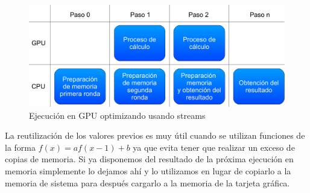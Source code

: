 \begin{figure}
	\centering
	\includegraphics[width=1\textwidth]{images/ejec_gpu_complex.pdf}
	\caption{Ejecución en GPU optimizando usando streams}\label{fig:cudaejecavanzada}
\end{figure}

La reutilización de los valores previos es muy útil cuando se utilizan funciones de la forma $f(x) = af(x-1)+b$ ya que evita tener que realizar un exceso de copias de memoria. Si ya disponemos del resultado de la próxima ejecución en memoria simplemente lo dejamos ahí y lo utilizamos en lugar de copiarlo a la memoria de sistema para después cargarlo a la memoria de la tarjeta gráfica.



